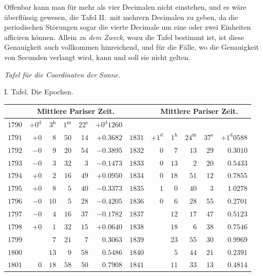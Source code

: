 Offenbar kann man für mehr als vier Decimalen nicht einstehen, und es wäre überflüssig gewesen, die Tafel II.\ mit mehrern Decimalen zu geben, da die periodischen Störungen sogar die vierte Decimale um eine oder zwei Einheiten afficiren können. Allein \emph{zu dem Zweck}, wozu die Tafel bestimmt ist, ist diese Genauigkeit auch vollkommen hinreichend, und für die Fälle, wo die Genauigkeit von Secunden verlangt wird, kann und soll sie nicht gelten.
\clearpage
{}%
\begin{center}
\emph{Tafel für die Coordinaten der Sonne.}

\medskip
I. Tafel. Die Epochen.

\medskip
\begingroup\fontsize{9}{10.2}\selectfont
\setlength{\tabcolsep}{3pt}
\begin{tabular}{r|rrrr|r||r|rrrr|r}
&\multicolumn{5}{c||}{Mittlere Pariser Zeit.}& &\multicolumn{5}{c}{Mittlere Pariser Zeit.}\\\hline
$1790$ & $+0^{\mathrm d}$ & $3^{\mathrm h}$ & $1^{\mathrm m}$ & $22^{\mathrm s}$ & $+0^{\mathrm d}1260$ &  &  &  &  &  & \\
$1791$ & $+0$ & $8$ & $50$ & $14$ & $+0.3682$ & $1831$ & $+1^{\mathrm d}$ & $1^{\mathrm h}$ & $24^{\mathrm m}$ & $37^{\mathrm s}$ & $+1^{\mathrm d}0588$\\
$1792$ & $-0$ & $9$ & $20$ & $54$ & $-0.3895$ & $1832$ & $0$ & $7$ & $13$ & $29$ & $0.3010$\\
$1793$ & $-0$ & $3$ & $32$ & $3$ & $-0.1473$ & $1833$ & $0$ & $13$ & $2$ & $20$ & $0.5433$\\
$1794$ & $+0$ & $2$ & $16$ & $49$ & $+0.0950$ & $1834$ & $0$ & $18$ & $51$ & $12$ & $0.7855$\\
$1795$ & $+0$ & $8$ & $5$ & $40$ & $-0.3373$ & $1835$ & $1$ & $0$ & $40$ & $3$ & $1.0278$\\[3pt]
$1796$ & $-0$ & $10$ & $5$ & $28$ & $-0.4205$ & $1836$ & $0$ & $6$ & $28$ & $55$ & $0.2701$\\
$1797$ & $-0$ & $4$ & $16$ & $37$ & $-0.1782$ & $1837$ &  & $12$ & $17$ & $47$ & $0.5123$\\
$1798$ & $+0$ & $1$ & $32$ & $15$ & $+0.0640$ & $1838$ &  & $18$ & $6$ & $38$ & $0.7546$\\
$1799$ &  & $7$ & $21$ & $7$ & $0.3063$ & $1839$ &  & $23$ & $55$ & $30$ & $0.9969$\\
$1800$ &  & $13$ & $9$ & $58$ & $0.5486$ & $1840$ &  & $5$ & $44$ & $21$ & $0.2391$\\[3pt]
$1801$ & $0$ & $18$ & $58$ & $50$ & $0.7908$ & $1841$ &  & $11$ & $33$ & $13$ & $0.4814$\\

\end{tabular}
\end{center}
